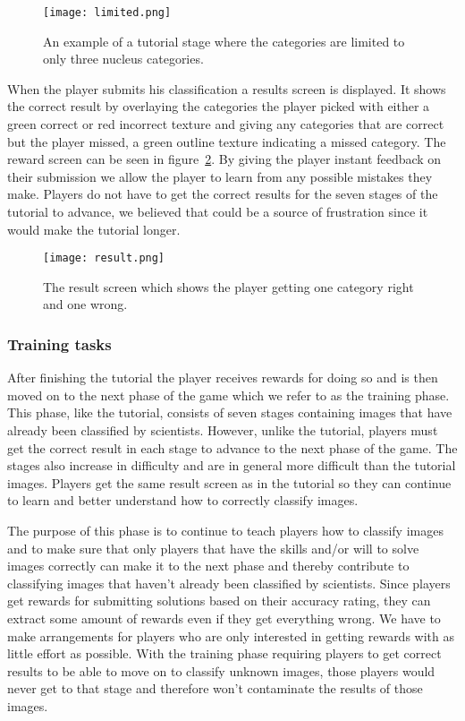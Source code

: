 \begin{figure}[H]
\centering
\graphicspath{ {./graphics/} }
\centerline{\texttt{[image: limited.png]}}
\caption{\label{fig:limited}An example of a tutorial stage where the categories are limited to only three nucleus categories.}
\end{figure}

When the player submits his classification a results screen is displayed. It shows the correct result by overlaying the categories the player picked with either a green correct or red incorrect texture and giving any categories that are correct but the player missed, a green outline texture indicating a missed category. The reward screen can be seen in figure~\ref{fig:result}. By giving the player instant feedback on their submission we allow the player to learn from any possible mistakes they make. Players do not have to get the correct results for the seven stages of the tutorial to advance, we believed that could be a source of frustration since it would make the tutorial longer. 

\begin{figure}[H]
\centering
\graphicspath{ {./graphics/} }
\centerline{\texttt{[image: result.png]}}
\caption{\label{fig:result}The result screen which shows the player getting one category right and one wrong.}
\end{figure}

\subsubsection{Training tasks}
After finishing the tutorial the player receives rewards for doing so and is then moved on to the next phase of the game which we refer to as the training phase. This phase, like the tutorial, consists of seven stages containing images that have already been classified by scientists. However, unlike the tutorial, players must get the correct result in each stage to advance to the next phase of the game. The stages also increase in difficulty and are in general more difficult than the tutorial images. Players get the same result screen as in the tutorial so they can continue to learn and better understand how to correctly classify images. 

The purpose of this phase is to continue to teach players how to classify images and to make sure that only players that have the skills and/or will to solve images correctly can make it to the next phase and thereby contribute to classifying images that haven't already been classified by scientists. Since players get rewards for submitting solutions based on their accuracy rating, they can extract some amount of rewards even if they get everything wrong. We have to make arrangements for players who are only interested in getting rewards with as little effort as possible. With the training phase requiring players to get correct results to be able to move on to classify unknown images, those players would never get to that stage and therefore won't contaminate the results of those images.

